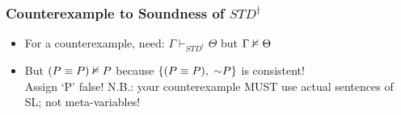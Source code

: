 \begin{frame}
\frametitle{Counterexample to Soundness of $STD^{\dagger}$}

\begin{itemize}[<+->]

\item For a counterexample, need: $\Gamma \vdash_{STD^{\dagger}} \Theta$ but $\Gamma \nvDash \Theta$


\medskip



\medskip

\item<3-> But $(P \equiv P) \nvDash P$ because  $\{(P \eiff P), \; \enot P\}$ is consistent! \\ Assign `P' false! N.B.: your counterexample MUST use actual sentences of SL; not meta-variables!

\end{itemize}



\end{frame}



